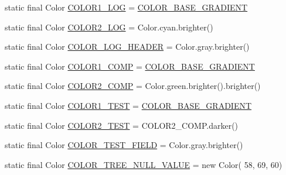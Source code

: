 \begin{DoxyCompactItemize}
\item 
static final Color \hyperlink{classit_1_1emarolab_1_1cagg_1_1debugging_1_1DebuggingDefaults_a9f7a16ba43783335336580b7566cf2d8}{C\-O\-L\-O\-R1\-\_\-\-L\-O\-G} = \hyperlink{classit_1_1emarolab_1_1cagg_1_1debugging_1_1DebuggingDefaults_a17491ab8ed655381e8f8cc34e9d3b670}{C\-O\-L\-O\-R\-\_\-\-B\-A\-S\-E\-\_\-\-G\-R\-A\-D\-I\-E\-N\-T}
\item 
static final Color \hyperlink{classit_1_1emarolab_1_1cagg_1_1debugging_1_1DebuggingDefaults_a7d5db3f257ab457fb097b27d480e67c9}{C\-O\-L\-O\-R2\-\_\-\-L\-O\-G} = Color.\-cyan.\-brighter()
\item 
static final Color \hyperlink{classit_1_1emarolab_1_1cagg_1_1debugging_1_1DebuggingDefaults_a7b3fec9ea2f75bc8babf48c11e00e669}{C\-O\-L\-O\-R\-\_\-\-L\-O\-G\-\_\-\-H\-E\-A\-D\-E\-R} = Color.\-gray.\-brighter()
\item 
static final Color \hyperlink{classit_1_1emarolab_1_1cagg_1_1debugging_1_1DebuggingDefaults_a32f81a64fecaefa7a86090eb6ecbbb77}{C\-O\-L\-O\-R1\-\_\-\-C\-O\-M\-P} = \hyperlink{classit_1_1emarolab_1_1cagg_1_1debugging_1_1DebuggingDefaults_a17491ab8ed655381e8f8cc34e9d3b670}{C\-O\-L\-O\-R\-\_\-\-B\-A\-S\-E\-\_\-\-G\-R\-A\-D\-I\-E\-N\-T}
\item 
static final Color \hyperlink{classit_1_1emarolab_1_1cagg_1_1debugging_1_1DebuggingDefaults_a8b051f6641a8ed71cbc44a02f559a479}{C\-O\-L\-O\-R2\-\_\-\-C\-O\-M\-P} = Color.\-green.\-brighter().brighter()
\item 
static final Color \hyperlink{classit_1_1emarolab_1_1cagg_1_1debugging_1_1DebuggingDefaults_a6dbcece18ae2f50b0acf05993eadc992}{C\-O\-L\-O\-R1\-\_\-\-T\-E\-S\-T} = \hyperlink{classit_1_1emarolab_1_1cagg_1_1debugging_1_1DebuggingDefaults_a17491ab8ed655381e8f8cc34e9d3b670}{C\-O\-L\-O\-R\-\_\-\-B\-A\-S\-E\-\_\-\-G\-R\-A\-D\-I\-E\-N\-T}
\item 
static final Color \hyperlink{classit_1_1emarolab_1_1cagg_1_1debugging_1_1DebuggingDefaults_a28013e6efe17d286b61999ee35a21933}{C\-O\-L\-O\-R2\-\_\-\-T\-E\-S\-T} = C\-O\-L\-O\-R2\-\_\-\-C\-O\-M\-P.\-darker()
\item 
static final Color \hyperlink{classit_1_1emarolab_1_1cagg_1_1debugging_1_1DebuggingDefaults_a1b215a9bddc350c593a94a07c6796887}{C\-O\-L\-O\-R\-\_\-\-T\-E\-S\-T\-\_\-\-F\-I\-E\-L\-D} = Color.\-gray.\-brighter()
\item 
static final Color \hyperlink{classit_1_1emarolab_1_1cagg_1_1debugging_1_1DebuggingDefaults_ad364a2707633e14f2a4e92fe53495993}{C\-O\-L\-O\-R\-\_\-\-T\-R\-E\-E\-\_\-\-N\-U\-L\-L\-\_\-\-V\-A\-L\-U\-E} = new Color( 58, 69, 60)

\end{DoxyCompactItemize}
